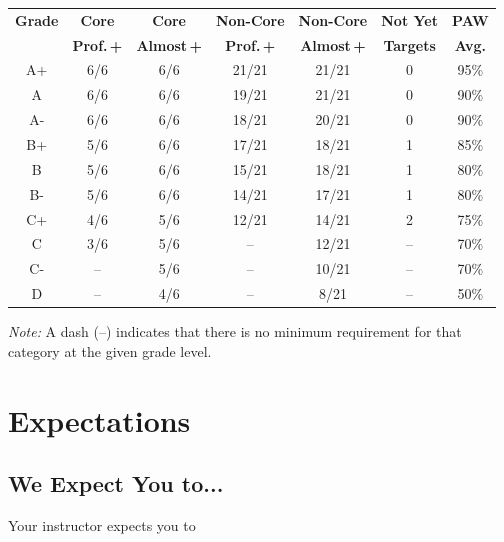 \documentclass[12pt]{article}
\begin{document}
	
\begin{center}
\renewcommand{\arraystretch}{1.2}
\begin{tabular}{c c c c c c c}
\toprule
\textbf{Grade} &
\textbf{Core} &
\textbf{Core} &
\textbf{Non-Core} &
\textbf{Non-Core} &
\textbf{Not Yet} &
\textbf{PAW} \\
&
\textbf{Prof.\,+} &
\textbf{Almost\,+} &
\textbf{Prof.\,+} &
\textbf{Almost\,+} &
\textbf{Targets} &
\textbf{Avg.} \\
\midrule
A+ & 6/6 & 6/6 & 21/21 & 21/21 & 0 & 95\% \\
A  & 6/6 & 6/6 & 19/21 & 21/21 & 0 & 90\% \\
A- & 6/6 & 6/6 & 18/21 & 20/21 & 0 & 90\% \\
B+ & 5/6 & 6/6 & 17/21 & 18/21 & 1 & 85\% \\
B  & 5/6 & 6/6 & 15/21 & 18/21 & 1 & 80\% \\
B- & 5/6 & 6/6 & 14/21 & 17/21 & 1 & 80\% \\
C+ & 4/6 & 5/6 & 12/21 & 14/21 & 2 & 75\% \\
C  & 3/6 & 5/6 & -- & 12/21 & -- & 70\% \\
C- & --  & 5/6 & -- & 10/21 & -- & 70\% \\
D  & --  & 4/6 & -- & 8/21  & -- & 50\% \\
\bottomrule
\end{tabular}
\end{center}

\vspace{0.5em}
\begin{minipage}{0.9\linewidth}
\small
\textit{Note:} A dash (--) indicates that there is no minimum requirement for that category at the given grade level.
\end{minipage}




	\section{Expectations}
	
	\subsection{We Expect You to...}
	
	Your instructor expects you to
	
\end{document}

